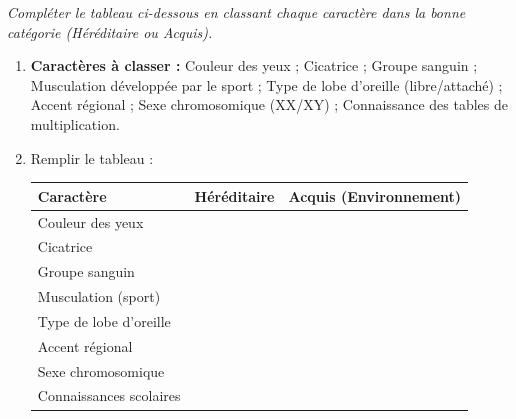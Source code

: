 \documentclass[11pt]{article}
\begin{document}
\begin{exercice}
\emph{Compléter le tableau ci-dessous en classant chaque caractère dans la bonne catégorie (Héréditaire ou Acquis).}
\begin{enumerate}
    \item \textbf{Caractères à classer :} Couleur des yeux ; Cicatrice ; Groupe sanguin ; Musculation développée par le sport ; Type de lobe d'oreille (libre/attaché) ; Accent régional ; Sexe chromosomique (XX/XY) ; Connaissance des tables de multiplication.
    \item Remplir le tableau :
    \begin{center}
    \begin{tabular}{|l|c|c|}
    \hline
    \textbf{Caractère} & \textbf{Héréditaire} & \textbf{Acquis (Environnement)} \\
    \hline
    Couleur des yeux & & \\
    \hline
    Cicatrice & & \\
    \hline
    Groupe sanguin & & \\
    \hline
    Musculation (sport) & & \\
    \hline
    Type de lobe d'oreille & & \\
    \hline
    Accent régional & & \\
    \hline
    Sexe chromosomique & & \\
    \hline
    Connaissances scolaires & & \\
    \hline
    \end{tabular}
    \end{center}
\end{enumerate}
\end{exercice}
\end{document}
